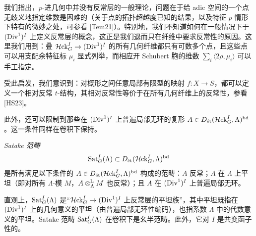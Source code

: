 我们指出，$p$-进几何中并没有反常层的一般理论，问题在于给 adic 空间的一个点无歧义地指定维数是困难的（关于点的拓扑超越度已知的结果，以及特征 $p$ 情形下特有的微妙之处，可参看 [Tem21]）。特别地，我们不知道如何在一般情况下于 $(\mathrm{Div}^1)^I$ 上定义反常层的概念，这正是我们退而只在纤维中要求反常性的原因。这里我们用到：叠 $\mathcal{H}\mathrm{ck}^I_G\to(\mathrm{Div}^1)^I$ 的所有几何纤维都只有可数多个点，且这些点可以用支配余特征标 $\mu_i$ 显式列举，而相应开 Schubert 胞的维数 $\sum_i\langle 2\rho,\mu_i\rangle$ 可以手工指定。

\begin{remark}%
受此启发，我们意识到：对概形之间任意局部有限型的映射 $f:X\to S$，都可以定义一个相对反常 $t$-结构，其相对反常性等价于在所有几何纤维上的反常性，参看 [HS23]。
\end{remark}

此外，还可以限制到那些在 $(\mathrm{Div}^1)^I$ 上普遍局部无环的复形 $A\in D_{\text{\'et}}(\mathcal{H}\mathrm{ck}^I_G,\Lambda)^{\mathrm{bd}}$。这一条件同样在卷积下保持。

\begin{definition}%
\emph{Satake 范畴}
\[
\operatorname{Sat}^I_G(\Lambda)\subset D_{\text{\'et}}(\mathcal{H}\mathrm{ck}^I_G,\Lambda)^{\mathrm{bd}}
\]
是所有满足以下条件的 $A\in D_{\text{\'et}}(\mathcal{H}\mathrm{ck}^I_G,\Lambda)^{\mathrm{bd}}$ 构成的范畴：$A$ 反常；$A$ 在 $\Lambda$ 上平坦（即对所有 $\Lambda$-模 $M$，$A\otimes^{\mathbb{L}}_{\Lambda}M$ 也反常）；且 $A$ 在 $(\mathrm{Div}^1)^I$ 上普遍局部无环。
\end{definition}



直观上，$\operatorname{Sat}^I_G(\Lambda)$ 是“$\mathcal{H}\mathrm{ck}^I_G\to(\mathrm{Div}^1)^I$ 上反常层的平坦族”，其中平坦既指在 $(\mathrm{Div}^1)^I$ 上的几何意义的平坦（由普遍局部无环性编码），也指系数 $\Lambda$ 中的代数意义的平坦。Satake 范畴 $\operatorname{Sat}^I_G(\Lambda)$ 在卷积下是幺半范畴。此外，它对 $I$ 是共变函子性的。

